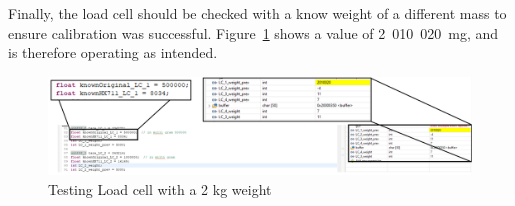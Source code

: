     Finally, the load cell should be checked with a know weight of a different mass to ensure calibration was successful. Figure~\ref{fig: testing_load_cell} shows a value of 2~010~020~mg, and is therefore operating as intended.
    \vspace*{-2mm}
    \begin{figure}[h]
        \centering
        \includegraphics*[width =\textwidth]{Appendix Documents/Calibration3.png}
        \caption{Testing Load cell with a 2 kg weight}
        \label{fig: testing_load_cell}
    \end{figure}

    
